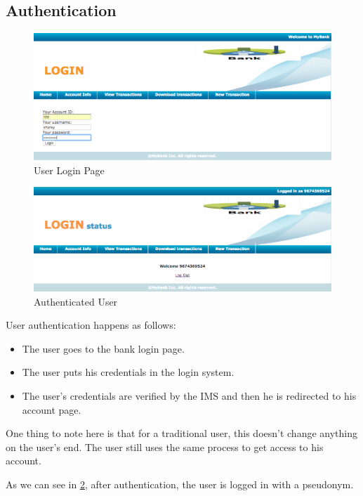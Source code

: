 \subsection{Authentication}
\begin{figure}[h]
	\centering
	\includegraphics[width=\textwidth]{figures/Login}
	\caption{User Login Page}
	\label{fig:Login}
\end{figure}
\begin{figure}[h]
	\centering
	\includegraphics[width=\textwidth]{figures/Logged}
	\caption{Authenticated User}
	\label{fig:Logged}
\end{figure}	
User authentication happens as follows:
\begin{itemize}
	\item The user goes to the bank login page.
	\item The user puts his credentials in the login system.
	\item The user's credentials are verified by the IMS and then he is redirected to his account page.
\end{itemize}
One thing to note here is that for a traditional user, this doesn't change anything on the user's end. The user still uses the same process to get access to his account.

As we can see in \ref{fig:Logged}, after authentication, the user is logged in with a pseudonym.	
